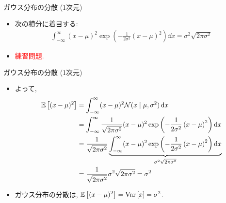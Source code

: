 \documentclass[dvipdfmx,notheorems,t]{beamer}
\begin{document}
\begin{frame}{ガウス分布の分散 (1次元)}
\begin{itemize}
  \item 次の積分に着目する:
  \begin{align*}
    \int_{-\infty}^\infty (x - \mu)^2
      \exp \left( -\frac{1}{2 \sigma^2} \left( x - \mu \right)^2 \right) \dd{x}
      = \sigma^2 \sqrt{2\pi \sigma^2}
  \end{align*}
  \item \textcolor{red}{練習問題.}
\end{itemize}
\end{frame}

\begin{frame}{ガウス分布の分散 (1次元)}
\begin{itemize}
  \item よって,
  \begin{align*}
    \operatorname{\mathbb{E}} \left[ (x - \mu)^2 \right] &= \int_{-\infty}^\infty (x - \mu)^2 \mathcal{N}(x \mid \mu, \sigma^2) \dd{x} \\
      &= \int_{-\infty}^\infty \frac{1}{\sqrt{2 \pi \sigma^2}} (x - \mu)^2
        \exp \left( -\frac{1}{2 \sigma^2} \left( x - \mu \right)^2 \right) \dd{x} \\
      &= \frac{1}{\sqrt{2 \pi \sigma^2}} \underbrace{\int_{-\infty}^\infty (x - \mu)^2
        \exp \left( -\frac{1}{2 \sigma^2} \left( x - \mu \right)^2 \right) \dd{x}}_{\sigma^2 \sqrt{2 \pi \sigma^2}} \\
      &= \frac{1}{\sqrt{2 \pi \sigma^2}} \sigma^2 \sqrt{2 \pi \sigma^2} = \sigma^2
  \end{align*}
  \item ガウス分布の分散は, $\operatorname{\mathbb{E}} \left[ (x - \mu)^2 \right] = \operatorname{Var} \left[ x \right] = \sigma^2$.
\end{itemize}
\end{frame}
\end{document}
